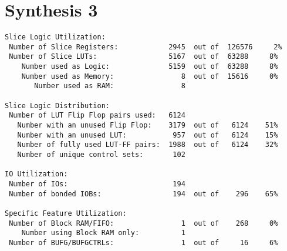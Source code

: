 \section*{Synthesis 3}
\begin{verbatim}
Slice Logic Utilization: 
 Number of Slice Registers:            2945  out of  126576     2%  
 Number of Slice LUTs:                 5167  out of  63288     8%  
    Number used as Logic:              5159  out of  63288     8%  
    Number used as Memory:                8  out of  15616     0%  
       Number used as RAM:                8

Slice Logic Distribution: 
 Number of LUT Flip Flop pairs used:   6124
   Number with an unused Flip Flop:    3179  out of   6124    51%  
   Number with an unused LUT:           957  out of   6124    15%  
   Number of fully used LUT-FF pairs:  1988  out of   6124    32%  
   Number of unique control sets:       102

IO Utilization: 
 Number of IOs:                         194
 Number of bonded IOBs:                 194  out of    296    65%  

Specific Feature Utilization:
 Number of Block RAM/FIFO:                1  out of    268     0%  
    Number using Block RAM only:          1
 Number of BUFG/BUFGCTRLs:                1  out of     16     6%  
\end{verbatim}
